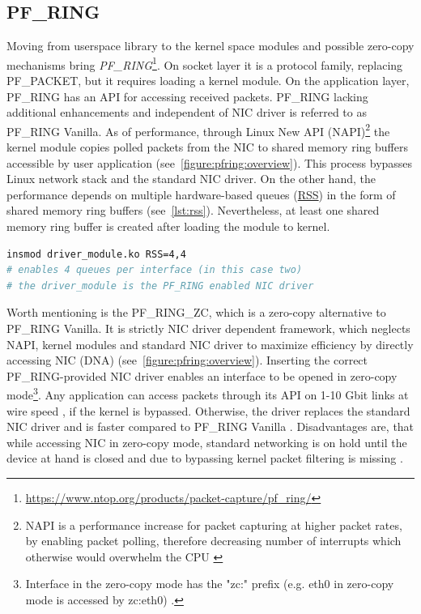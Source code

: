 \documentclass[12pt,a4paper,twoside]{book}
\begin{document}
        \subsection{PF\_RING} \label{analysis:mechs:pfring}
            Moving from userspace library to the kernel space modules and possible zero-copy mechanisms bring \emph{PF\_RING}\footnote{\url{https://www.ntop.org/products/packet-capture/pf_ring/}}. On socket layer it is a protocol family, replacing PF\_PACKET, but it requires loading a kernel module. On the application layer, PF\_RING has an API for accessing received packets. PF\_RING lacking additional enhancements and independent of NIC driver is referred to as PF\_RING Vanilla. As of performance, through Linux New API (NAPI)\footnote{NAPI is a performance increase for packet capturing at higher packet rates, by enabling packet polling, therefore decreasing number of interrupts which otherwise would overwhelm the CPU \cite{web:linux:napi}} the kernel module copies polled packets from the NIC to shared memory ring buffers accessible by user application (see~\autoref{figure:pfring:overview})\cite{web:pfring:vanilla}. This process bypasses Linux network stack and the standard NIC driver. On the other hand, the performance depends on multiple hardware-based queues (\hyperref[analysis:mechs:scapy_rss]{RSS}) in the form of shared memory ring buffers (see~\autoref{lst:rss}). Nevertheless, at least one shared memory ring buffer is created after loading the module to kernel. \cite{docs:pfring:vanilla}
            \begin{lstlisting}[language=bash, caption=Enabling RSS \cite{docs:pfring:rss}., label=lst:rss]
insmod driver_module.ko RSS=4,4
# enables 4 queues per interface (in this case two)
# the driver_module is the PF_RING enabled NIC driver
            \end{lstlisting}
            \par
            Worth mentioning is the PF\_RING\_ZC, which is a zero-copy alternative to PF\_RING Vanilla. It is strictly NIC driver dependent framework, which neglects NAPI, kernel modules and standard NIC driver to maximize efficiency by directly accessing NIC (DNA) (see~\autoref{figure:pfring:overview}). Inserting the correct PF\_RING-provided NIC driver enables an interface to be opened in zero-copy mode\footnote{Interface in the zero-copy mode has the "zc:" prefix (e.g. eth0 in zero-copy mode is accessed by zc:eth0) \cite{docs:pfring:zero}.}. Any application can access packets through its API on 1-10 Gbit links at wire speed \cite{docs:pfring:zero}, if the kernel is bypassed. Otherwise, the driver replaces the standard NIC driver and is faster compared to PF\_RING Vanilla \cite{web:pfring:zero}. Disadvantages are, that while accessing NIC in zero-copy mode, standard networking is on hold until the device at hand is closed \cite{web:pfring:zero} and due to bypassing kernel packet filtering is missing \cite{docs:pfring:zero}.\par
\end{document}
